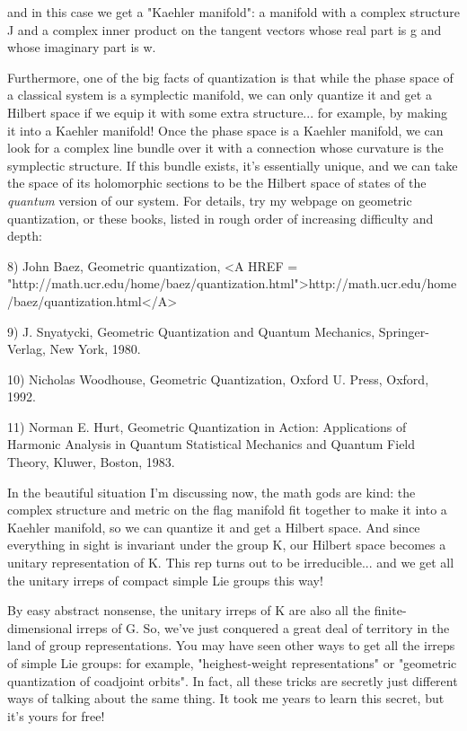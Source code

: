 and in this case we get a "Kaehler manifold": a manifold with a complex
structure J and a complex inner product on the tangent vectors whose
real part is g and whose imaginary part is w. 

Furthermore, one of the big facts of quantization is that while the
phase space of a classical system is a symplectic manifold, we can only
quantize it and get a Hilbert space if we equip it with some extra
structure... for example, by making it into a Kaehler manifold!  Once
the phase space is a Kaehler manifold, we can look for a complex line
bundle over it with a connection whose curvature is the symplectic
structure.  If this bundle exists, it's essentially unique, and we can
take the space of its holomorphic sections to be the Hilbert space of
states of the \emph{quantum} version of our system.   For details, try my
webpage on geometric quantization, or these books, listed in rough order
of increasing difficulty and depth:

8) John Baez, Geometric quantization, 
<A HREF = "http://math.ucr.edu/home/baez/quantization.html">http://math.ucr.edu/home/baez/quantization.html</A>

9) J. Snyatycki, Geometric Quantization and Quantum Mechanics,
Springer-Verlag, New York, 1980. 

10) Nicholas Woodhouse, Geometric Quantization, Oxford U. Press, Oxford,
1992.

11) Norman E. Hurt, Geometric Quantization in Action: Applications of
Harmonic Analysis in Quantum Statistical Mechanics and Quantum Field
Theory, Kluwer, Boston, 1983.

In the beautiful situation I'm discussing now, the math gods are kind:
the complex structure and metric on the flag manifold fit together to
make it into a Kaehler manifold, so we can quantize it and get a Hilbert
space.  And since everything in sight is invariant under the group K,
our Hilbert space becomes a unitary representation of K.  This rep turns
out to be irreducible... and we get all the unitary irreps of compact
simple Lie groups this way!

By easy abstract nonsense, the unitary irreps of K are also all the
finite-dimensional irreps of G.  So, we've just conquered a great deal
of territory in the land of group representations.  You may have seen
other ways to get all the irreps of simple Lie groups: for example,
"heighest-weight representations" or "geometric quantization of
coadjoint orbits".  In fact, all these tricks are secretly just
different ways of talking about the same thing.  It took me years 
to learn this secret, but it's yours for free!  

